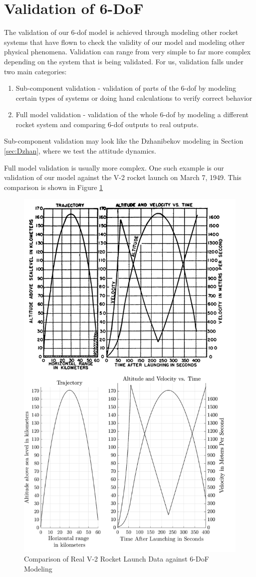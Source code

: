 \documentclass[12pt]{report}
\begin{document}
\section{Validation of 6-DoF}
The validation of our 6-\gls{dof} model is achieved through modeling other rocket systems that have flown to check the validity of our model and modeling other physical phenomena. Validation can range from very simple to far more complex depending on the system that is being validated. For us, validation falls under two main categories:
\begin{enumerate}
    \item Sub-component validation - validation of parts of the 6-\gls{dof} by modeling certain types of systems or doing hand calculations to verify correct behavior
    \item Full model validation - validation of the whole 6-\gls{dof} by modeling a different rocket system and comparing 6-\gls{dof} outputs to real outputs.
\end{enumerate}

Sub-component validation may look like the Dzhanibekov modeling in Section \ref{sec:Dzhan}, where we test the attitude dynamics.

Full model validation is usually more complex. One such example is our validation of our model against the V-2 rocket launch on March 7, 1949. This comparison is shown in Figure \ref{fig:V2 sim}

\begin{figure}
    \centering
    \includegraphics[width=.75\linewidth]{Images/V2 Combined.png}
    \caption{Comparison of Real V-2 Rocket Launch Data against 6-DoF Modeling}
    \label{fig:V2 sim}
\end{figure}
\end{document}
